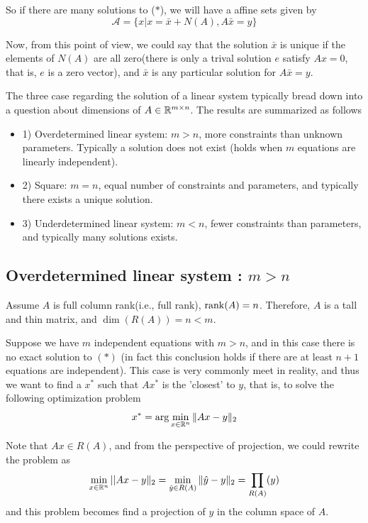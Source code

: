 So if there are many solutions to ($*$), we will have a affine sets given by
\begin{equation*}
\mathcal{A} = \{x|x = \bar{x} + N(A), A\bar{x} = y \}
\end{equation*}

Now, from this point of view, we could say that the solution $\bar{x}$ is unique if the elements of $N(A)$ are all zero(there is only a trival solution $e$ satisfy $Ax=0$, that is, $e$ is a zero vector), and $\bar{x}$ is any particular solution for $A\bar{x} =y$.

\vspace{0.5cm}
The three case regarding the solution of a linear system typically bread down into a question about dimensions of $A\in \mathbb{R}^{m\times n}$. The results are summarized as follows
\begin{itemize}
	\item 1) Overdetermined linear system: $m>n$, more constraints than unknown parameters. Typically a solution does not exist (holds when $m$ equations are linearly independent).
	
	\item 2) Square: $m=n$, equal number of constraints and parameters, and typically there exists a unique solution.
	
	\item 3) Underdetermined linear system: $m<n$, fewer constraints than parameters, and typically many solutions exists.
\end{itemize}

\vspace{0.3cm}
\subsection{Overdetermined linear system : $m > n$ }


Assume $A$ is full column rank(i.e., full rank), $\operatorname{rank}(A) =n$. Therefore, $A$ is a tall and thin matrix, and $\dim(R(A)) = n < m$.

Suppose we have $m$ independent equations with $m>n$, and in this case there is no exact solution to $(*)$ (in fact this conclusion holds if there are at least $n+1$ equations are independent). This case is very commonly meet in reality, and thus we want to find a $x^*$ such that $Ax^*$ is the 'closest' to $y$, that is, to solve the following optimization problem
$$x^* = \arg \min_{x\in \mathbb{R}^n}\Vert Ax - y\Vert_2$$

Note that $Ax \in R(A)$, and from the perspective of projection, we could rewrite the problem as
$$\min_{x\in \mathbb{R}^{n}}||Ax - y\Vert_2 = \min_{\hat{y}\in R(A)}\Vert \hat{y} - y\Vert_2 =\prod_{R(A)}(y)$$
and this problem becomes find a projection of $y$ in the column space of $A$.

